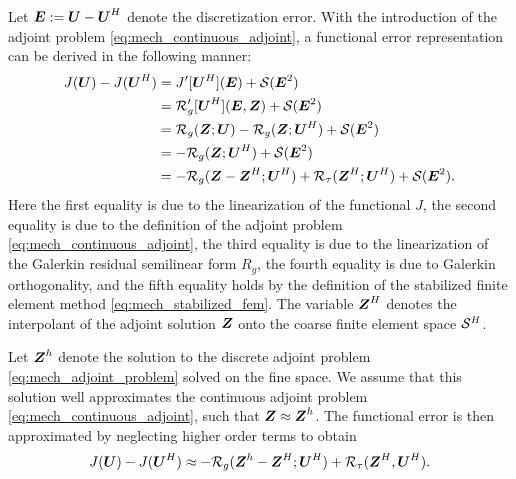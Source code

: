 Let $\bs{E} := \bs{U} - \bs{U}^H$ denote the discretization error.
With the introduction of the adjoint problem
\eqref{eq:mech_continuous_adjoint}, a functional error representation can be
derived in the following manner:
%
\begin{gather}
\begin{aligned}
J(\bs{U}) - J(\bs{U}^H) &= J'[\bs{U}^H](\bs{E}) + \O(\bs{E}^2) \\
&= \R'_g[\bs{U}^H](\bs{E}, \bs{Z}) + \O(\bs{E}^2) \\
&= \R_g(\bs{Z}; \bs{U}) - \R_g(\bs{Z} ; \bs{U}^H) + \O(\bs{E}^2) \\
&= - \R_g(\bs{Z}; \bs{U}^H) + \O(\bs{E}^2) \\
&= - \R_g(\bs{Z} - \bs{Z}^H; \bs{U}^H) + \R_{\tau}(\bs{Z}^H; \bs{U}^H) +
\O(\bs{E}^2).
\end{aligned}
\label{eq:mech_error_representation}
\end{gather}
%
Here the first equality is due to the linearization \cite{becker2001optimal}
of the functional $J$, the second equality is due to the definition
of the adjoint problem \eqref{eq:mech_continuous_adjoint}, the third
equality is due to the linearization \cite{becker2001optimal} of the Galerkin
residual semilinear form $R_g$, the fourth equality is due to Galerkin
orthogonality, and the fifth equality holds by the definition of the
stabilized finite element method \eqref{eq:mech_stabilized_fem}.
The variable $\bs{Z}^H$ denotes the interpolant of the adjoint solution
$\bs{Z}$ onto the coarse finite element space $\S^H$.

Let $\bs{Z}^h$ denote the solution to the discrete adjoint problem
\eqref{eq:mech_adjoint_problem} solved on the fine space. We assume that
this solution well approximates the continuous adjoint problem
\eqref{eq:mech_continuous_adjoint}, such that $\bs{Z} \approx \bs{Z}^h$.
The functional error is then approximated by neglecting higher order terms
to obtain
%
\begin{gather}
J(\bs{U}) - J(\bs{U}^H) \approx
- \R_g(\bs{Z}^h - \bs{Z}^H; \bs{U}^H) + \R_{\tau}(\bs{Z}^H, \bs{U}^H).
\label{eq:mech_error_approx}
\end{gather}

